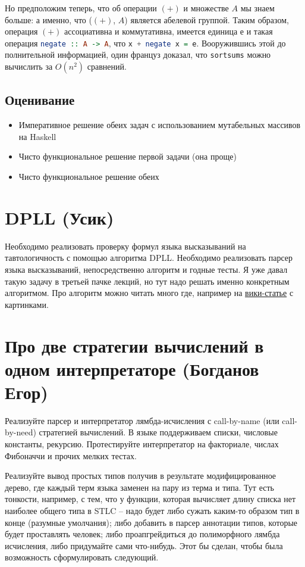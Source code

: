 \documentclass[a4paper,14pt]{article}
\def\hsinline{\lstinline[language=haskell]}
\begin{document}
 Но предположим теперь, что об операции $(+)$ и множестве $A$ мы знаем
 больше: а именно, что ($(+)$, $A$)  является абелевой группой. Таким образом,
 операция $(+)$ ассоциативна и коммутативна, имеется единица $е$ и такая 
 операция \hsinline=negate :: A -> A=, что \hsinline!x + negate x = e!. Вооружившись этой до полнительной информацией, один француз доказал,
 что \hsinline=sortsums= можно вычислить за $O(n^2)$ сравнений.

\subsection{Оценивание}
\begin{itemize}
 \item[3] Императивное решение обеих задач с использованием мутабельных массивов на Haskell
 \item[4] Чисто функциональное решение первой задачи (она проще)
 \item[5] Чисто функциональное решение обеих
\end{itemize}

\section{DPLL (Усик)}

Необходимо реализовать проверку формул языка высказываний на тавтологичность с помощью алгоритма DPLL. Необходимо реализовать парсер языка высказываний, непосредственно алгоритм и годные тесты. Я уже давал такую задачу в третьей пачке лекций, но тут надо решать именно конкретным алгоритмом. Про алгоритм можно читать много где, например на \href{https://en.wikipedia.org/wiki/DPLL_algorithm}{вики-статье} с картинками.


\section{Про две стратегии вычислений в одном интерпретаторе (Богданов Егор)}

Реализуйте парсер и интерпретатор лямбда-исчисления с call-by-name (или call-by-need) стратегией вычислений. В языке поддерживаем списки, числовые константы, рекурсию. Протестируйте интерпретатор на факториале, числах Фибоначчи и прочих мелких тестах.

Реализуйте вывод простых типов получив в результате модифицированное дерево, где каждый терм языка заменен на пару из терма и типа. Тут есть тонкости, например, с тем, что у функции, которая вычисляет длину списка нет наиболее общего типа в STLC -- надо будет либо сужать каким-то образом тип в конце (разумные умолчания); либо добавить в парсер аннотации типов, которые будет проставлять человек; либо проапгрейдиться до полиморфного лямбда исчисления, либо придумайте сами что-нибудь. Этот бы сделан, чтобы была возможность сформулировать следующий.
\end{document}
